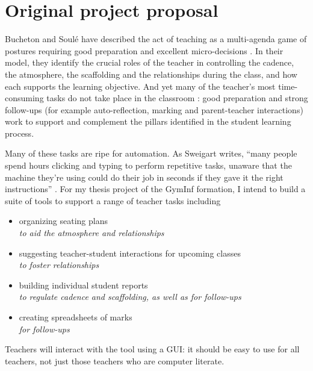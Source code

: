 \documentclass[10pt]{article}
\begin{document}
\appendix

\section{Original project proposal}

Bucheton and Soulé have described the act of teaching as a multi-agenda game of postures requiring good preparation and excellent micro-decisions \cite{BS09}. In their model, they identify the crucial roles of the teacher in controlling the cadence, the atmosphere, the scaffolding and the relationships during the class, and how each supports the learning objective. And yet many of the teacher's most time-consuming tasks do not take place in the classroom \cite{Bryant20}: good preparation and strong follow-ups (for example auto-reflection, marking and parent-teacher interactions) work to support and complement the pillars identified in the student learning process.

Many of these tasks are ripe for automation. As Sweigart writes, ``many people spend hours clicking and typing to perform repetitive tasks, unaware that the machine they’re using could do their job in seconds if they gave it the right instructions'' \cite{Swei15}.  For my thesis project of the GymInf formation, I intend to build a suite of tools to support a range of teacher tasks including 
\begin{itemize} 
\item organizing seating plans \\
\emph{to aid the atmosphere and relationships} 
\item suggesting teacher-student interactions for upcoming classes \\
\emph{to foster relationships}
\item building individual student reports \\
\emph{to regulate cadence and scaffolding, as well as for follow-ups}
\item creating spreadsheets of marks \\
\emph{for follow-ups}
\end{itemize}
Teachers will interact with the tool using a GUI: it should be easy to use for all teachers, not just those teachers who are computer literate.
\end{document}

